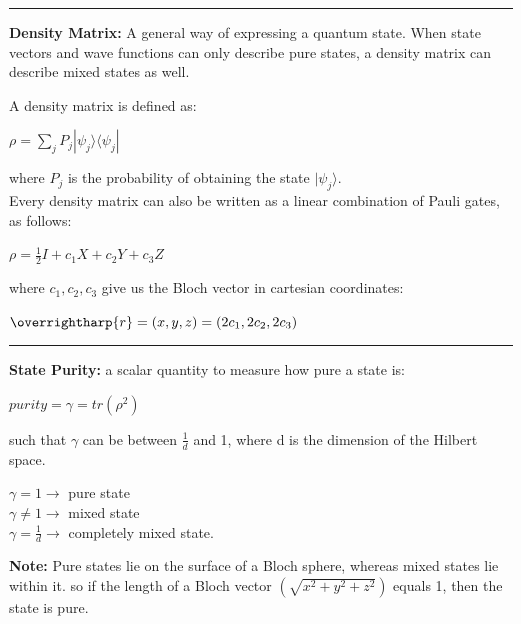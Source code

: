 \documentclass{article}
\begin{document}
\vspace{5pt}
\hrule
\vspace{5pt}

\newpage


\textbf{Density Matrix:} A general way of expressing a quantum state.
When state vectors and wave functions can only describe pure states, a density matrix can describe mixed states as well.

A density matrix is defined as:

\begin{center}
$ \displaystyle \rho = \sum_{j} P_{j}  |{\psi}_{j} \rangle \langle{\psi}_{j} | $
\end{center}
where $P_{j}$ is the probability of obtaining the state $|\psi_{j} \rangle$. \\

Every density matrix can also be written as a linear combination of Pauli gates, as follows:

\begin{center}
$\rho = \frac{1}{2} I + c_{1} X + c_{2}Y + c_{3}Z$ \\
\end{center}

where  $c_{1}, c_{2}, c_{3}$ give us the Bloch vector in cartesian coordinates:
\begin{center}
$\overrightharp{r} = (x, y, z) = (2c_{1}, 2c_{2}, 2c_{3})$
\end{center}


\vspace{5pt}
\hrule 
\vspace{5pt}


\textbf{State Purity:} a scalar quantity to measure how pure a state is:

\begin{center}
$ purity = \gamma = tr(\rho^2) $
\end{center}

such that $\gamma$ can be between $\frac{1}{d}$ and 1, where d is the dimension of the Hilbert space.

\begin{center}
$\gamma = 1 \rightarrow $ pure state \\
$\gamma \ne 1 \rightarrow $ mixed state \\
$\gamma = \frac{1}{d} \rightarrow $  completely mixed state. %
\end{center}

\textbf{Note:} Pure states lie on the surface of a Bloch sphere, whereas mixed states lie within it. 
so if the length of a Bloch vector $(\sqrt{x^2 + y^2 + z^2} )$ equals 1, then the state is pure. 
\end{document}
